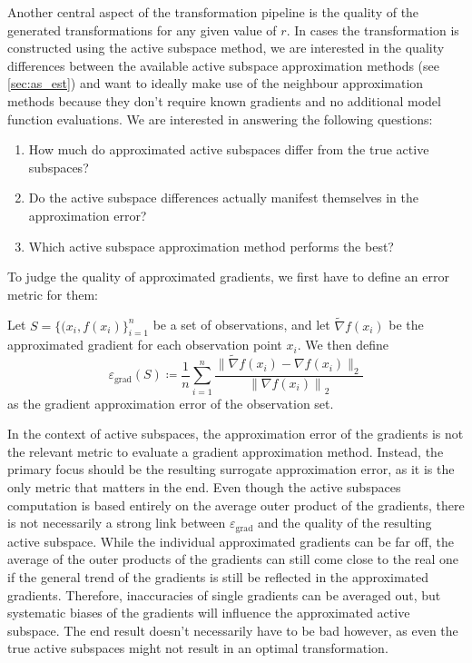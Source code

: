 \documentclass[
  a4paper,  %
  twoside,  %
  bibliography=totoc,
  headsepline,
  cleardoublepage=empty,
  parskip=half,
  draft=false
]{scrbook}
\begin{document}
Another central aspect of the transformation pipeline is the quality of the generated transformations for any given value of $r$.
In cases the transformation is constructed using the active subspace method, we are interested in the quality differences between the available active subspace approximation methods (see \cref{sec:as_est}) and want to ideally make use of the neighbour approximation methods because they don't require known gradients and no additional model function evaluations.
We are interested in answering the following questions:
\begin{enumerate}
\item How much do approximated active subspaces differ from the true active subspaces?
\item Do the active subspace differences actually manifest themselves in the approximation error?
\item Which active subspace approximation method performs the best?
\end{enumerate}
\newpage
\noindent
To judge the quality of approximated gradients, we first have to define an error metric for them:
\begin{definition}
Let $S=\{(x_i, f(x_i)\}_{i=1}^n$ be a set of observations, and let $\widetilde{\nabla} f(x_i)$ be the approximated gradient for each observation point $x_i$. We then define
\begin{equation}
\varepsilon_{\mathrm{grad}}(S) \coloneqq \frac{1}{n} \sum_{i=1}^n \frac{\|{\widetilde{\nabla} f(x_i) - \nabla f(x_i)}\|_2}{{\| \nabla f(x_i) \|}_2}
\label{eq:e_grad}
\end{equation}
as the gradient approximation error of the observation set.
\end{definition}
%
In the context of active subspaces, the approximation error of the gradients is not the relevant metric to evaluate a gradient approximation method.
Instead, the primary focus should be the resulting surrogate approximation error, as it is the only metric that matters in the end.
Even though the active subspaces computation is based entirely on the average outer product of the gradients, there is not necessarily a strong link between $\varepsilon_{\text{grad}}$ and the quality of the resulting active subspace.
While the individual approximated gradients can be far off, the average of the outer products of the gradients can still come close to the real one if the general trend of the gradients is still be reflected in the approximated gradients.
Therefore, inaccuracies of single gradients can be averaged out, but systematic biases of the gradients will influence the approximated active subspace.
The end result doesn't necessarily have to be bad however, as even the true active subspaces might not result in an optimal transformation.
\end{document}
